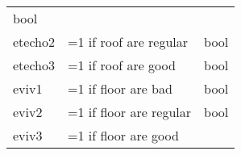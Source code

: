 \documentclass[11pt]{article}
\begin{document}
\begin{longtable}[]{@{}lll@{}}
\begin{minipage}[t]{0.24\columnwidth}
bool\strut
\end{minipage}\tabularnewline
\begin{minipage}[t]{0.19\columnwidth}\raggedright\strut
etecho2\strut
\end{minipage} & \begin{minipage}[t]{0.16\columnwidth}\raggedright\strut
=1 if roof are regular\strut
\end{minipage} & \begin{minipage}[t]{0.24\columnwidth}\raggedright\strut
bool\strut
\end{minipage}\tabularnewline
\begin{minipage}[t]{0.19\columnwidth}\raggedright\strut
etecho3\strut
\end{minipage} & \begin{minipage}[t]{0.16\columnwidth}\raggedright\strut
=1 if roof are good\strut
\end{minipage} & \begin{minipage}[t]{0.24\columnwidth}\raggedright\strut
bool\strut
\end{minipage}\tabularnewline
\begin{minipage}[t]{0.19\columnwidth}\raggedright\strut
eviv1\strut
\end{minipage} & \begin{minipage}[t]{0.16\columnwidth}\raggedright\strut
=1 if floor are bad\strut
\end{minipage} & \begin{minipage}[t]{0.24\columnwidth}\raggedright\strut
bool\strut
\end{minipage}\tabularnewline
\begin{minipage}[t]{0.19\columnwidth}\raggedright\strut
eviv2\strut
\end{minipage} & \begin{minipage}[t]{0.16\columnwidth}\raggedright\strut
=1 if floor are regular\strut
\end{minipage} & \begin{minipage}[t]{0.24\columnwidth}\raggedright\strut
bool\strut
\end{minipage}\tabularnewline
\begin{minipage}[t]{0.19\columnwidth}\raggedright\strut
eviv3\strut
\end{minipage} & \begin{minipage}[t]{0.16\columnwidth}\raggedright\strut
=1 if floor are good\strut
\end{minipage} & \begin{minipage}[t]{0.24\columnwidth}\raggedright\strut

\end{minipage}
\end{longtable}
\end{document}

